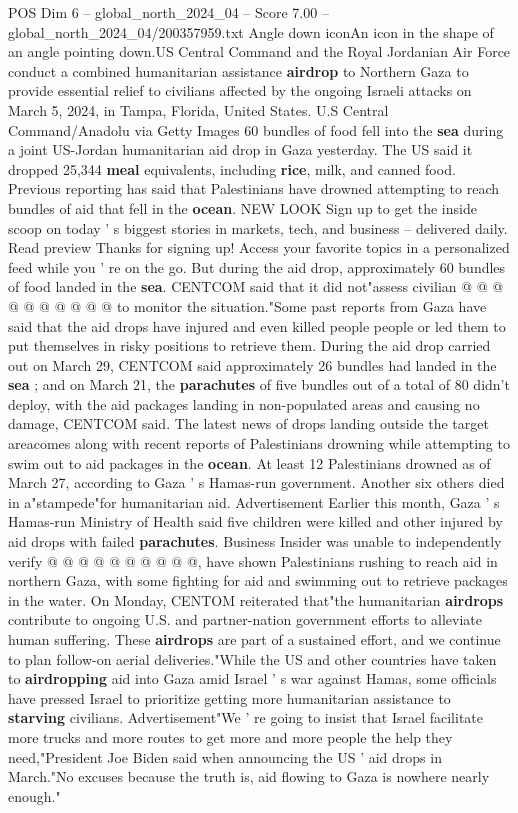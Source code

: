 \begin{textsample}{POS Dim 6 – global\_north\_2024\_04 – Score 7.00 – global\_north\_2024\_04/200357959.txt}  \label{ex:f6_pos_118}
Angle down iconAn icon in the shape of an angle pointing down.US Central Command and the Royal Jordanian Air Force conduct a combined humanitarian assistance \textbf{airdrop} to Northern Gaza to provide essential relief to civilians affected by the ongoing Israeli attacks on March 5, 2024, in Tampa, Florida, United States.
U.S Central Command/Anadolu via Getty Images 60 bundles of food fell into the \textbf{sea} during a joint US-Jordan humanitarian aid drop in Gaza yesterday.
The US said it dropped 25,344 \textbf{meal} equivalents, including \textbf{rice}, milk, and canned food.
Previous reporting has said that Palestinians have drowned attempting to reach bundles of aid that fell in the \textbf{ocean}.
NEW LOOK Sign up to get the inside scoop on today ' s biggest stories in markets, tech, and business -- delivered daily.
Read preview Thanks for signing up!
Access your favorite topics in a personalized feed while you ' re on the go.
But during the aid drop, approximately 60 bundles of food landed in the \textbf{sea}.
CENTCOM said that it did not"assess civilian @ @ @ @ @ @ @ @ @ @ to monitor the situation."Some past reports from Gaza have said that the aid drops have injured and even killed people people or led them to put themselves in risky positions to retrieve them.
During the aid drop carried out on March 29, CENTCOM said approximately 26 bundles had landed in the \textbf{sea} ; and on March 21, the \textbf{parachutes} of five bundles out of a total of 80 didn't deploy, with the aid packages landing in non-populated areas and causing no damage, CENTCOM said.
The latest news of drops landing outside the target areacomes along with recent reports of Palestinians drowning while attempting to swim out to aid packages in the \textbf{ocean}.
At least 12 Palestinians drowned as of March 27, according to Gaza ' s Hamas-run government.
Another six others died in a"stampede"for humanitarian aid.
Advertisement Earlier this month, Gaza ' s Hamas-run Ministry of Health said five children were killed and other injured by aid drops with failed \textbf{parachutes}.
Business Insider was unable to independently verify @ @ @ @ @ @ @ @ @ @, have shown Palestinians rushing to reach aid in northern Gaza, with some fighting for aid and swimming out to retrieve packages in the water.
On Monday, CENTOM reiterated that"the humanitarian \textbf{airdrops} contribute to ongoing U.S. and partner-nation government efforts to alleviate human suffering.
These \textbf{airdrops} are part of a sustained effort, and we continue to plan follow-on aerial deliveries."While the US and other countries have taken to \textbf{airdropping} aid into Gaza amid Israel ' s war against Hamas, some officials have pressed Israel to prioritize getting more humanitarian assistance to \textbf{starving} civilians.
Advertisement"We ' re going to insist that Israel facilitate more trucks and more routes to get more and more people the help they need,"President Joe Biden said when announcing the US ' aid drops in March."No excuses because the truth is, aid flowing to Gaza is nowhere nearly enough."

\end{textsample}
